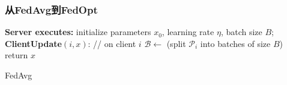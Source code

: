 
\begin{frame}
\frametitle{从FedAvg到FedOpt}

\begin{algorithm}[H]
\SetAlgoNoLine
\DontPrintSemicolon
{\bfseries Server executes:}\;
\Indp initialize parameters $x_0$, learning rate $\eta$, batch size $B$;
\Indm
\vspace{0.2em}
{\bfseries ClientUpdate}$(i, x)$: // on client $i$\;
\Indp $\mathcal{B} \gets$ (split $\mathcal{P}_i$ into batches of size $B$)\;
return $x$\;
\caption{FedAvg}
\end{algorithm}

\end{frame}


